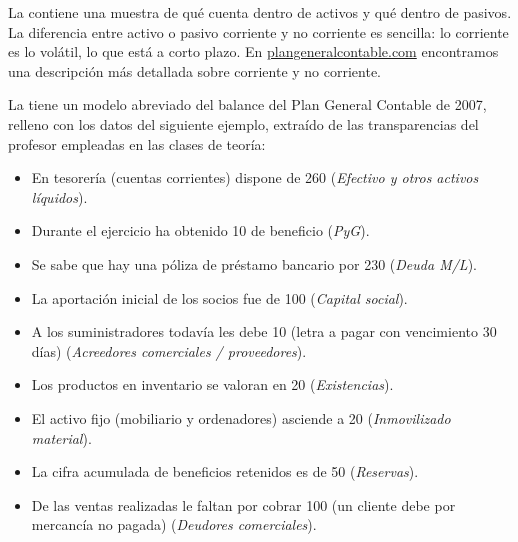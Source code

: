 \documentclass[nochap,palatino,shortheader]{apuntes}
\begin{document}
La  contiene una muestra de qué cuenta dentro de activos y qué dentro de pasivos. La diferencia entre activo o pasivo corriente y no corriente es sencilla: lo corriente es lo volátil, lo que está a corto plazo. 
En \href{http://www.plangeneralcontable.com/?tit=guia-del-pgc-de-pymes&name=GeTia&contentId=man_pgcpym&lastCtg=ctg_13&manPage=25}{plangeneralcontable.com} encontramos una descripción más detallada sobre corriente y no corriente.

La  tiene un modelo abreviado del balance del Plan General Contable de 2007, relleno con los datos del siguiente ejemplo, extraído de las transparencias del profesor empleadas en las clases de teoría:

\begin{itemize}
\item En tesorería (cuentas corrientes) dispone de 260 (\textit{Efectivo y otros activos líquidos}).
\item Durante el ejercicio ha obtenido 10 de beneficio (\textit{PyG}).
\item Se sabe que hay una póliza de préstamo bancario por 230 (\textit{Deuda M/L}).
\item La aportación inicial de los socios fue de 100 (\textit{Capital social}).
\item A los suministradores todavía les debe 10 (letra a pagar con vencimiento 30 días) (\textit{Acreedores comerciales / proveedores}).
\item Los productos en inventario se valoran en 20 (\textit{Existencias}).
\item El activo fijo (mobiliario y ordenadores) asciende a 20 (\textit{Inmovilizado material}).
\item La cifra acumulada de beneficios retenidos es de 50 (\textit{Reservas}).
\item De las ventas realizadas le faltan por cobrar 100 (un cliente debe por mercancía no pagada) (\textit{Deudores comerciales}).
\end{itemize}
\end{document}
